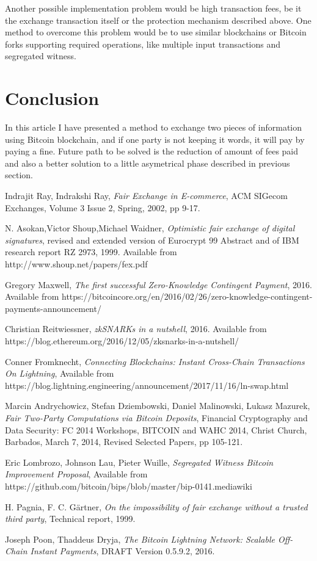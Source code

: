 \documentclass[]{article}
\begin{document}
Another possible implementation problem would be high transaction fees, be it the exchange transaction itself or the protection mechanism described above. One method to overcome this problem would be to use similar blockchains or Bitcoin forks supporting required operations, like multiple input transactions and segregated witness.

\section{Conclusion}

In this article I have presented a method to exchange two pieces of information using Bitcoin blockchain, and if one party is not keeping it words, it will pay by paying a fine. Future path to be solved is the reduction of amount of fees paid and also a better solution to a little asymetrical phase described in previous section.

\begin{thebibliography}{9}
	Indrajit Ray, Indrakshi Ray, 
	\textit{Fair Exchange in E-commerce},
	ACM SIGecom Exchanges, Volume 3 Issue 2, Spring, 2002,
	pp 9-17. 
	
	    N. Asokan,Victor Shoup,Michael Waidner,
	    \textit{Optimistic fair exchange of digital signatures},
	    revised and extended version of Eurocrypt 99 Abstract and of IBM research report RZ 2973, 1999. Available from http://www.shoup.net/papers/fex.pdf
		
	Gregory Maxwell,
	\textit{The first successful Zero-Knowledge Contingent Payment}, 2016.
	Available from https://bitcoincore.org/en/2016/02/26/zero-knowledge-contingent-payments-announcement/
	
	Christian Reitwiessner,
	\textit{zkSNARKs in a nutshell}, 2016.
	Available from
	https://blog.ethereum.org/2016/12/05/zksnarks-in-a-nutshell/
	
	Conner Fromknecht,
	\textit{Connecting Blockchains: Instant Cross-Chain Transactions On Lightning},
	Available from https://blog.lightning.engineering/announcement/2017/11/16/ln-swap.html
	
	Marcin Andrychowicz, Stefan Dziembowski, Daniel Malinowski, Lukasz Mazurek,
	\textit{Fair Two-Party Computations via Bitcoin Deposits}, Financial Cryptography and Data Security: FC 2014 Workshops, BITCOIN and WAHC 2014, Christ Church, Barbados, March 7, 2014, Revised Selected Papers, pp 105-121.
	
	Eric Lombrozo, Johnson Lau, Pieter Wuille,
	\textit{Segregated Witness Bitcoin Improvement Proposal},
	Available from https://github.com/bitcoin/bips/blob/master/bip-0141.mediawiki
	
	H. Pagnia, F. C. Gärtner, 
	\textit{On the impossibility of fair exchange without a trusted
	third party}, Technical report, 1999.

	Joseph Poon, Thaddeus Dryja,
	\textit{The Bitcoin Lightning Network: Scalable Off-Chain Instant Payments}, DRAFT Version 0.5.9.2, 2016.
	    
\end{thebibliography}
\end{document}
